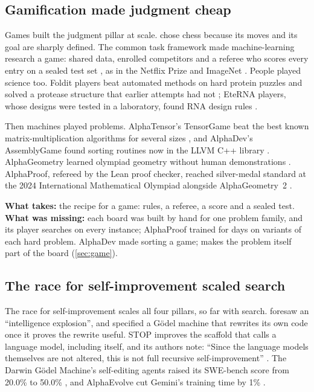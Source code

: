 \subsection{Gamification made judgment cheap}\label{sub:road-games}

Games built the judgment pillar at scale. \citet{shannon1950chess} chose
chess because its moves and its goal are sharply defined. The common task
framework made machine-learning research a game: shared data, enrolled
competitors and a referee who scores every entry on a sealed test set
\citep{donoho2017fifty}, as in the Netflix Prize \citep{bennett2007netflix}
and ImageNet \citep{russakovsky2015imagenet}. People played science too.
Foldit players beat automated methods on hard protein puzzles
\citep{cooper2010foldit} and solved a protease structure that earlier
attempts had not \citep{khatib2011protease}; EteRNA players, whose designs
were tested in a laboratory, found RNA design rules \citep{lee2014eterna}.

Then machines played problems. AlphaTensor's TensorGame beat the best known
matrix-multiplication algorithms for several sizes
\citep{fawzi2022alphatensor}, and AlphaDev's AssemblyGame found sorting
routines now in the LLVM C++ library \citep{mankowitz2023alphadev}.
AlphaGeometry learned olympiad geometry without human demonstrations
\citep{trinh2024alphageometry}. AlphaProof, refereed by the Lean proof
checker, reached silver-medal standard at the 2024 International
Mathematical Olympiad alongside AlphaGeometry~2 \citep{hubert2026alphaproof}.

\smallskip
\noindent\textbf{What \EZ{} takes:} the recipe for a game: rules, a referee,
a score and a sealed test.\\
\textbf{What was missing:} each board was built by hand for one problem
family, and its player searches on every instance; AlphaProof trained for
days on variants of each hard problem. AlphaDev made sorting a game; \EZ{}
makes the problem itself part of the board (\cref{sec:game}).

\subsection{The race for self-improvement scaled search}\label{sub:road-self}

The race for self-improvement scales all four pillars, so far with search.
\citet{good1966speculations} foresaw an ``intelligence explosion'', and
\citet{schmidhuber2003goedel} specified a G\"odel machine that rewrites its
own code once it proves the rewrite useful. STOP improves the scaffold that calls a language model, including
itself, and its authors note: ``Since the language models themselves are
not altered, this is not full recursive self-improvement''
\citep{zelikman2024stop}. The Darwin G\"odel Machine's self-editing agents
raised its SWE-bench score from 20.0\% to 50.0\% \citep{zhang2025dgm}, and
AlphaEvolve cut Gemini's training time by 1\%
\citep{novikov2025alphaevolve}.

